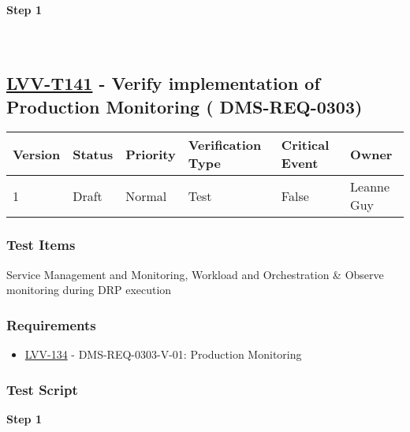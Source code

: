 \textbf{Step 1}\\
~\\
~\\

\hypertarget{lvv-t141---verify-implementation-of-production-monitoring-dms-req-0303}{%
\subsection{\texorpdfstring{\href{https://jira.lsstcorp.org/secure/Tests.jspa\#/testCase/LVV-T141}{LVV-T141}
- Verify implementation of Production Monitoring (
DMS-REQ-0303)}{LVV-T141 - Verify implementation of Production Monitoring ( DMS-REQ-0303)}}\label{lvv-t141---verify-implementation-of-production-monitoring-dms-req-0303}}

\begin{longtable}[]{@{}llllll@{}}
\toprule
Version & Status & Priority & Verification Type & Critical Event &
Owner\tabularnewline
\midrule
\endhead
1 & Draft & Normal & Test & False & Leanne Guy\tabularnewline
\bottomrule
\end{longtable}

\hypertarget{test-items-41}{%
\subsubsection{Test Items}\label{test-items-41}}

Service Management and Monitoring, Workload and Orchestration \& Observe
monitoring during DRP execution

\hypertarget{requirements-41}{%
\subsubsection{Requirements}\label{requirements-41}}

\begin{itemize}
\tightlist
\item
  \href{https://jira.lsstcorp.org/browse/LVV-134}{LVV-134} -
  DMS-REQ-0303-V-01: Production Monitoring
\end{itemize}

\hypertarget{test-script-41}{%
\subsubsection{Test Script}\label{test-script-41}}

\textbf{Step 1}\\
~\\
~\\

